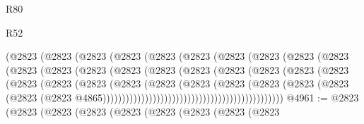\begin{lexlean}{R80}
\begin{lexlean}{R52}
\begin{coremodule}
{{{{{{{{{{{{{{{{{{{{{{{{{{{{{{{{{{{{{{{{{{{{{{{{{{{{{{{{{{{{{{{{{{{{{{{{{{{{{{{{{{{{{{{{{{{{{{{{{{{{{{{{{{{{{{{{{{{{{{{{{{{{{{{{{{{{{{{{{{{{{{{{{{{{{{{{{{{{{{{{{{{{{{{{{{{{{{{{{{{{{{{{{{{{{{{{{{{{{{                                  (@2823
                                    (@2823
                                      (@2823
                                        (@2823
                                          (@2823
                                            (@2823
                                              (@2823
                                                (@2823
                                                  (@2823
                                                    (@2823
                                                      (@2823
                                                        (@2823
                                                          (@2823
                                                            (@2823
                                                              (@2823
                                                                (@2823
                                                                  (@2823
                                                                    (@2823
                                                                      (@2823
                                                                        (@2823
                                                                          (@2823
                                                                            (@2823
                                                                              (@2823
                                                                                (@2823
                                                                                  (@2823
                                                                                    (@2823
                                                                                      (@2823
                                                                                        (@2823
                                                                                          (@2823
                                                                                            (@2823
                                                                                              (@2823
                                                                                                (@2823
                                                                                                  @4865)))))))))))))))))))))))))))))))))))))))))))))))
@4961 := @2823
    (@2823
      (@2823
        (@2823
          (@2823
            (@2823
              (@2823
                (@2823
                  (@2823
}}}}}}}}}}}}}}}}}}}}}}}}}}}}}}}}}}}}}}}}}}}}}}}}}}}}}}}}}}}}}}}}}}}}}}}}}}}}}}}}}}}}}}}}}}}}}}}}}}}}}}}}}}}}}}}}}}}}}}}}}}}}}}}}}}}}}}}}}}}}}}}}}}}}}}}}}}}}}}}}}}}}}}}}}}}}}}}}}}}}}}}}}}}}}}}}}}}}}}
\end{coremodule}
\end{lexlean}
\end{lexlean}
